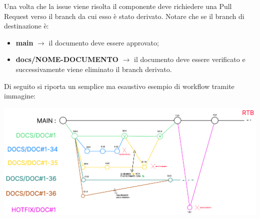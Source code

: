         
        Una volta che la issue viene risolta il componente deve richiedere una Pull Request
        verso il branch da cui esso è stato derivato.
        Notare che se il branch di destinazione è:
        \begin{itemize}
            \item \textbf{main} $\rightarrow$ il documento deve essere approvato;
            \item \textbf{docs/NOME-DOCUMENTO} $\rightarrow$ il documento deve essere verificato e successivamente viene eliminato il branch derivato.
        \end{itemize}

        Di seguito si riporta un semplice ma esaustivo esempio di workflow tramite immagine:
        \begin{center}
            \includegraphics[scale = 0.33]{template/images/workflow.png}
        \end{center}

